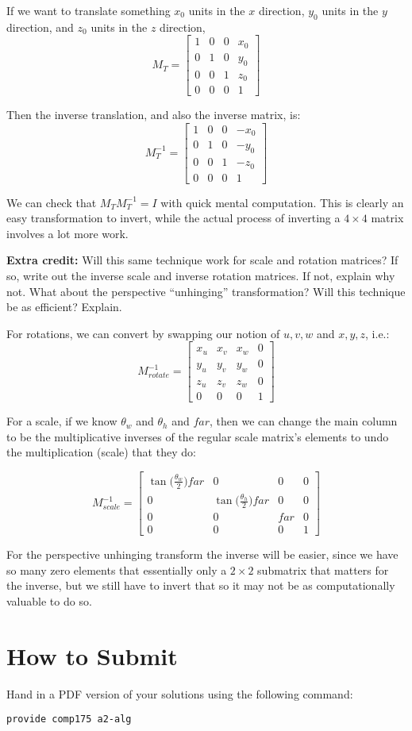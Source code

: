 \documentclass[10pt,twocolumn]{article}
\begin{document}
\begin{framed}
If we want to translate something $x_0$ units in the $x$ direction, $y_0$ units in the $y$ direction, and $z_0$ units in the $z$ direction,
\[M_T = \begin{bmatrix}
    1 & 0 & 0 & x_0 \\
    0 & 1 & 0 & y_0 \\
    0 & 0 & 1 & z_0 \\
    0 & 0 & 0 & 1
\end{bmatrix} \]

Then the inverse translation, and also the inverse matrix, is:
\[M_T^{-1} = \begin{bmatrix}
    1 & 0 & 0 & -x_0 \\
    0 & 1 & 0 & -y_0 \\
    0 & 0 & 1 & -z_0 \\
    0 & 0 & 0 & 1
\end{bmatrix} \]

We can check that $M_T M_T^{-1} = I$ with quick mental computation. This is clearly an easy transformation to invert, while the actual process of inverting a $4\times 4$ matrix involves a lot more work.
\end{framed}


{\bf Extra credit:} Will this same technique work for scale and rotation matrices? If so, write out the inverse scale and inverse rotation matrices. If not, explain why not. What about the perspective ``unhinging'' transformation? Will this technique be as efficient? Explain.
\begin{framed}
For rotations, we can convert by swapping our notion of $u, v, w$ and $x, y, z$, i.e.:
\[M_{rotate}^{-1} = \begin{bmatrix}
    x_u & x_v & x_w & 0 \\
    y_u & y_v & y_w & 0 \\
    z_u & z_v & z_w & 0 \\
    0 & 0 & 0 & 1
\end{bmatrix}\]

For a scale, if we know $\theta_w$ and $\theta_h$ and $far$, then we can change the main column to be the multiplicative inverses of the regular scale matrix's elements to undo the multiplication (scale) that they do:

\[M_{scale}^{-1} = \begin{bmatrix}
    \tan\big(\frac{\theta_w}{2}\big) far & 0 & 0 & 0 \\
    0 & \tan\big(\frac{\theta_h}{2}\big) far & 0 & 0 \\
    0 & 0 & far & 0 \\
    0 & 0 & 0 & 1
\end{bmatrix}\]

For the perspective unhinging transform the inverse will be easier, since we have so many zero elements that essentially only a $2\times 2$ submatrix that matters for the inverse, but we still have to invert that so it may not be as computationally valuable to do so.
\end{framed}

\section{How to Submit}

Hand in a PDF version of your solutions using the following command:
\begin{center}
 {\tt provide comp175 a2-alg}
 \end{center}
\end{document}
